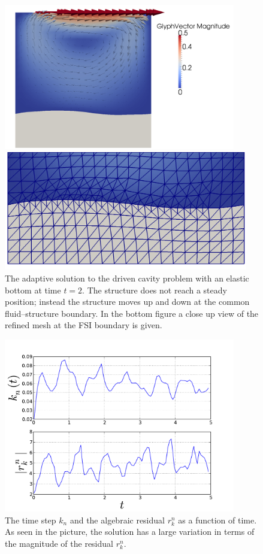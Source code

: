\begin{figure}
\label{selim:fig:primal_cavity}
\caption{The adaptive solution to the driven cavity problem with an
  elastic bottom at time $t=2$. The structure does not reach a steady
  position; instead the structure moves up and down at the common
  fluid--structure boundary. In the bottom figure a close up view of
  the refined mesh at the FSI boundary is given.}
\includegraphics[width=0.9\textwidth]{chapters/selim/png/cavity_large.png}

\includegraphics[width=0.95\textwidth]{chapters/selim/png/zoom_cavity.png}
\end{figure}
 \begin{figure}
\label{selim:fig:cavity_timestep}
\caption{The time step $k_n$ and the algebraic residual $r_k^n$ as
  a function of time. As seen in the picture, the solution has a large
  variation in terms of the magnitude of the residual $r_k^n$.}
\includegraphics[width=0.9\textwidth]{chapters/selim/pdf/plot.pdf}
\end{figure}

